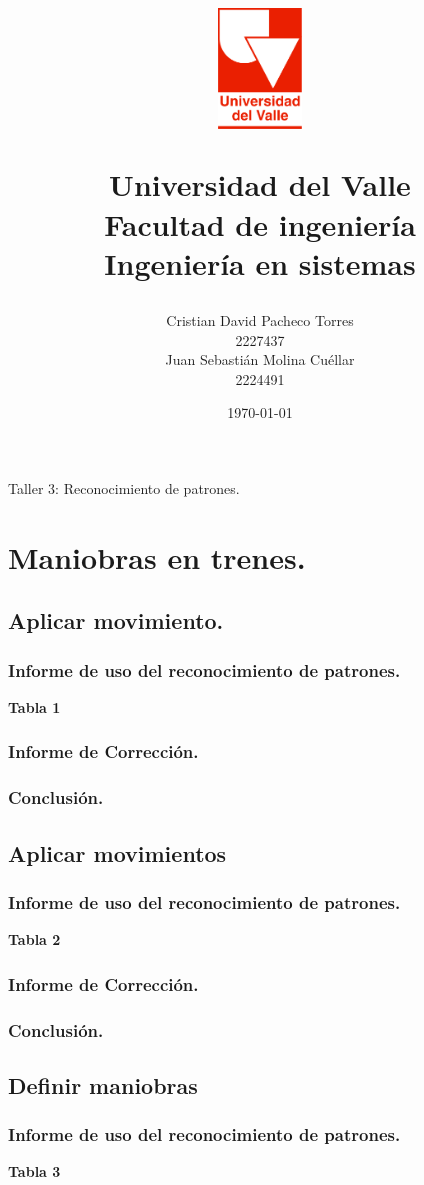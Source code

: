 \documentclass[12pt, a4paper]{article}
\title{
  \begin{figure}[th]
    \centering
    \includegraphics[width=0.2\textwidth]{Univalle}
  \end{figure}
  \textbf{Universidad del Valle
    \\{\Large Facultad de ingeniería}
  \\{\large Ingeniería en sistemas}}}
\author{Cristian David Pacheco Torres
  \\ 2227437
  \\ Juan Sebastián Molina Cuéllar
  \\ 2224491}
\date{\today}
\begin{document}
\maketitle
 { Taller 3: Reconocimiento de patrones.}
\newpage{}
\tableofcontents
\newpage{}
\section{Maniobras en trenes.}
\subsection{Aplicar movimiento.}
\subsubsection{Informe de uso del reconocimiento de patrones.}
\textbf{Tabla 1}
\subsubsection{Informe de Corrección.}
\subsubsection{Conclusión.}
\subsection{Aplicar movimientos}
\subsubsection{Informe de uso del reconocimiento de patrones.}
\textbf{Tabla 2}
\subsubsection{Informe de Corrección.}
\subsubsection{Conclusión.}
\subsection{Definir maniobras}
\subsubsection{Informe de uso del reconocimiento de patrones.}
\textbf{Tabla 3}
\end{document}
